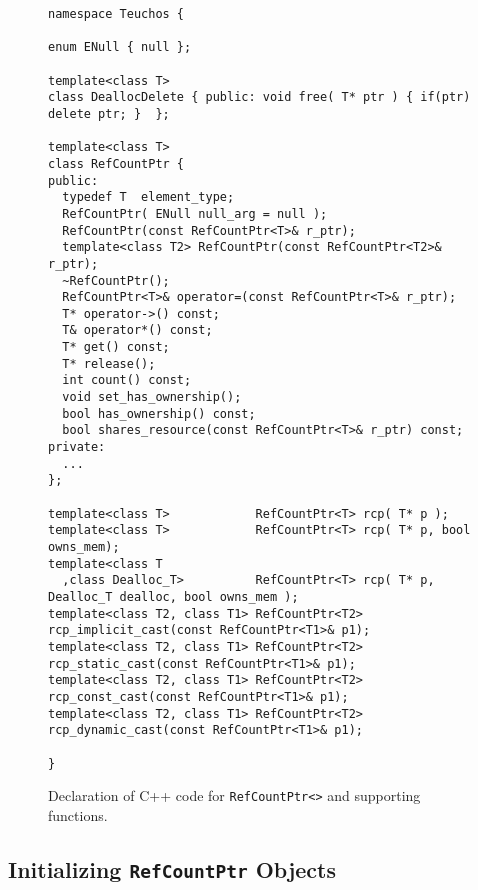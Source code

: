 \begin{figure}
{\scriptsize\begin{verbatim}
namespace Teuchos {

enum ENull { null };

template<class T>
class DeallocDelete { public: void free( T* ptr ) { if(ptr) delete ptr; }  };

template<class T>
class RefCountPtr {
public:
  typedef T  element_type;
  RefCountPtr( ENull null_arg = null );
  RefCountPtr(const RefCountPtr<T>& r_ptr);
  template<class T2> RefCountPtr(const RefCountPtr<T2>& r_ptr);
  ~RefCountPtr();
  RefCountPtr<T>& operator=(const RefCountPtr<T>& r_ptr);
  T* operator->() const;
  T& operator*() const;
  T* get() const;
  T* release();
  int count() const;
  void set_has_ownership();
  bool has_ownership() const;
  bool shares_resource(const RefCountPtr<T>& r_ptr) const;
private:
  ...
};

template<class T>            RefCountPtr<T> rcp( T* p );
template<class T>            RefCountPtr<T> rcp( T* p, bool owns_mem);
template<class T
  ,class Dealloc_T>          RefCountPtr<T> rcp( T* p, Dealloc_T dealloc, bool owns_mem );
template<class T2, class T1> RefCountPtr<T2> rcp_implicit_cast(const RefCountPtr<T1>& p1);
template<class T2, class T1> RefCountPtr<T2> rcp_static_cast(const RefCountPtr<T1>& p1);
template<class T2, class T1> RefCountPtr<T2> rcp_const_cast(const RefCountPtr<T1>& p1);
template<class T2, class T1> RefCountPtr<T2> rcp_dynamic_cast(const RefCountPtr<T1>& p1);

}
\end{verbatim}}
\caption{\label{rcp:fig:decl}
Declaration of C++ code for \texttt{RefCountPtr<>} and supporting functions.}
\end{figure}

%
\subsection{Initializing \texttt{RefCountPtr} Objects}
%

